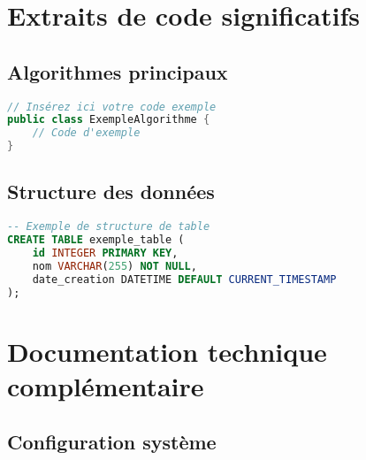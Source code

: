 \begin{appendices}
    \chapter{Extraits de code significatifs}
    \label{app:code}

    \section{Algorithmes principaux}


    \begin{lstlisting}[language=Java, caption=Exemple d'algorithme principal]
// Insérez ici votre code exemple
public class ExempleAlgorithme {
    // Code d'exemple
}
\end{lstlisting}

    \section{Structure des données}


    \begin{lstlisting}[language=SQL, caption=Structure de base de données]
-- Exemple de structure de table
CREATE TABLE exemple_table (
    id INTEGER PRIMARY KEY,
    nom VARCHAR(255) NOT NULL,
    date_creation DATETIME DEFAULT CURRENT_TIMESTAMP
);
\end{lstlisting}

    \chapter{Documentation technique complémentaire}
    \label{app:technical_doc}

    \section{Configuration système}



\end{appendices}
